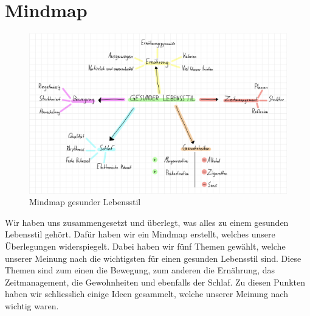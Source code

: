 \chapter{Mindmap}
\authortoc{\bastian}{\chapterident}
\begin{figure}[!ht]
  \centering
  \includegraphics[width=.9\linewidth]{./images/mindmap.png}
  \caption[Ein von uns digital erstelltes Mindmap]{Mindmap gesunder Lebensstil}
  \label{fig:mindmap}
\end{figure}
\pagebreak
Wir haben uns zusammengesetzt und überlegt, was alles zu einem gesunden Lebensstil gehört. Dafür haben wir ein Mindmap erstellt, welches unsere Überlegungen widerspiegelt. Dabei haben wir fünf Themen gewählt, welche unserer Meinung nach die wichtigsten für einen gesunden Lebensstil sind. Diese Themen sind zum einen die Bewegung, zum anderen die Ernährung, das Zeitmanagement, die Gewohnheiten und ebenfalls der Schlaf. Zu diesen Punkten haben wir schliesslich einige Ideen gesammelt, welche unserer Meinung nach wichtig waren.
